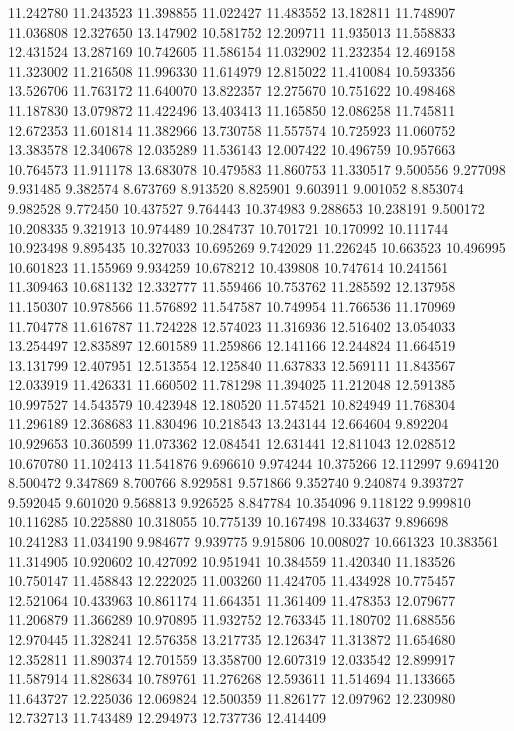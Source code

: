 11.242780
11.243523
11.398855
11.022427
11.483552
13.182811
11.748907
11.036808
12.327650
13.147902
10.581752
12.209711
11.935013
11.558833
12.431524
13.287169
10.742605
11.586154
11.032902
11.232354
12.469158
11.323002
11.216508
11.996330
11.614979
12.815022
11.410084
10.593356
13.526706
11.763172
11.640070
13.822357
12.275670
10.751622
10.498468
11.187830
13.079872
11.422496
13.403413
11.165850
12.086258
11.745811
12.672353
11.601814
11.382966
13.730758
11.557574
10.725923
11.060752
13.383578
12.340678
12.035289
11.536143
12.007422
10.496759
10.957663
10.764573
11.911178
13.683078
10.479583
11.860753
11.330517
9.500556
9.277098
9.931485
9.382574
8.673769
8.913520
8.825901
9.603911
9.001052
8.853074
9.982528
9.772450
10.437527
9.764443
10.374983
9.288653
10.238191
9.500172
10.208335
9.321913
10.974489
10.284737
10.701721
10.170992
10.111744
10.923498
9.895435
10.327033
10.695269
9.742029
11.226245
10.663523
10.496995
10.601823
11.155969
9.934259
10.678212
10.439808
10.747614
10.241561
11.309463
10.681132
12.332777
11.559466
10.753762
11.285592
12.137958
11.150307
10.978566
11.576892
11.547587
10.749954
11.766536
11.170969
11.704778
11.616787
11.724228
12.574023
11.316936
12.516402
13.054033
13.254497
12.835897
12.601589
11.259866
12.141166
12.244824
11.664519
13.131799
12.407951
12.513554
12.125840
11.637833
12.569111
11.843567
12.033919
11.426331
11.660502
11.781298
11.394025
11.212048
12.591385
10.997527
14.543579
10.423948
12.180520
11.574521
10.824949
11.768304
11.296189
12.368683
11.830496
10.218543
13.243144
12.664604
9.892204
10.929653
10.360599
11.073362
12.084541
12.631441
12.811043
12.028512
10.670780
11.102413
11.541876
9.696610
9.974244
10.375266
12.112997
9.694120
8.500472
9.347869
8.700766
8.929581
9.571866
9.352740
9.240874
9.393727
9.592045
9.601020
9.568813
9.926525
8.847784
10.354096
9.118122
9.999810
10.116285
10.225880
10.318055
10.775139
10.167498
10.334637
9.896698
10.241283
11.034190
9.984677
9.939775
9.915806
10.008027
10.661323
10.383561
11.314905
10.920602
10.427092
10.951941
10.384559
11.420340
11.183526
10.750147
11.458843
12.222025
11.003260
11.424705
11.434928
10.775457
12.521064
10.433963
10.861174
11.664351
11.361409
11.478353
12.079677
11.206879
11.366289
10.970895
11.932752
12.763345
11.180702
11.688556
12.970445
11.328241
12.576358
13.217735
12.126347
11.313872
11.654680
12.352811
11.890374
12.701559
13.358700
12.607319
12.033542
12.899917
11.587914
11.828634
10.789761
11.276268
12.593611
11.514694
11.133665
11.643727
12.225036
12.069824
12.500359
11.826177
12.097962
12.230980
12.732713
11.743489
12.294973
12.737736
12.414409
